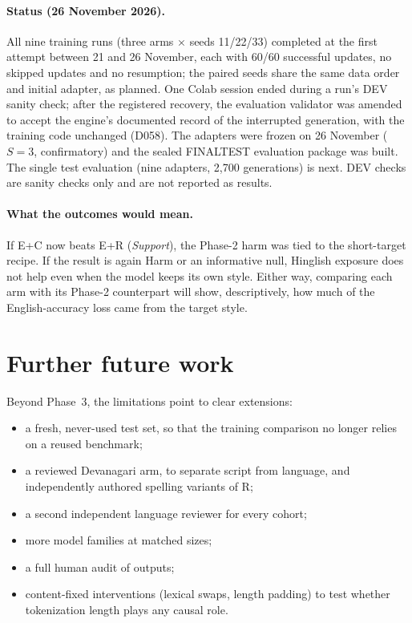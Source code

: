 \documentclass[12pt,a4paper,oneside]{report}
\renewcommand{\_}{\oldunderscore\allowbreak}
\begin{document}
\paragraph{Status (26 November 2026).} All nine training runs (three arms $\times$ seeds 11/22/33) completed at the first attempt between 21 and 26 November, each with 60/60 successful updates, no skipped updates and no resumption; the paired seeds share the same data order and initial adapter, as planned. One Colab session ended during a run's DEV sanity check; after the registered recovery, the evaluation validator was amended to accept the engine's documented record of the interrupted generation, with the training code unchanged (D058). The adapters were frozen on 26 November ($S=3$, confirmatory) and the sealed FINAL\_TEST evaluation package was built. The single test evaluation (nine adapters, 2,700 generations) is next. DEV checks are sanity checks only and are not reported as results.

\paragraph{What the outcomes would mean.} If E+C now beats E+R (\emph{Support}), the Phase-2 harm was tied to the short-target recipe. If the result is again Harm or an informative null, Hinglish exposure does not help even when the model keeps its own style. Either way, comparing each arm with its Phase-2 counterpart will show, descriptively, how much of the English-accuracy loss came from the target style.

\section{Further future work}
\label{sec:futurework}

Beyond Phase~3, the limitations point to clear extensions:
\begin{itemize}[nosep]
\item a fresh, never-used test set, so that the training comparison no longer relies on a reused benchmark;
\item a reviewed Devanagari arm, to separate script from language, and independently authored spelling variants of R;
\item a second independent language reviewer for every cohort;
\item more model families at matched sizes;
\item a full human audit of outputs;
\item content-fixed interventions (lexical swaps, length padding) to test whether tokenization length plays any causal role.
\end{itemize}
\end{document}
